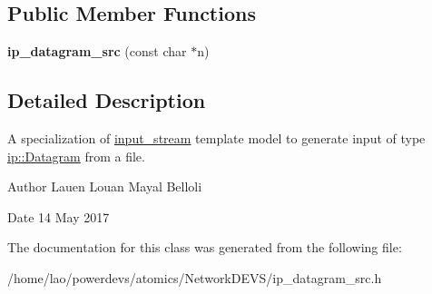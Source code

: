 \subsection*{Public Member Functions}
\begin{DoxyCompactItemize}
\item 
{\bfseries ip\+\_\+datagram\+\_\+src} (const char $\ast$n)\hypertarget{classip__datagram__src_a06b73f2700abc04cf41be7e0872e134e}{}\label{classip__datagram__src_a06b73f2700abc04cf41be7e0872e134e}

\end{DoxyCompactItemize}


\subsection{Detailed Description}
A specialization of \hyperlink{classinput__stream}{input\+\_\+stream} template model to generate input of type \hyperlink{structip_1_1Datagram}{ip\+::\+Datagram} from a file. 

\begin{DoxyAuthor}{Author}
Lauen Louan Mayal Belloli 
\end{DoxyAuthor}
\begin{DoxyDate}{Date}
14 May 2017 
\end{DoxyDate}


The documentation for this class was generated from the following file\+:\begin{DoxyCompactItemize}
\item 
/home/lao/powerdevs/atomics/\+Network\+D\+E\+V\+S/ip\+\_\+datagram\+\_\+src.\+h\end{DoxyCompactItemize}
